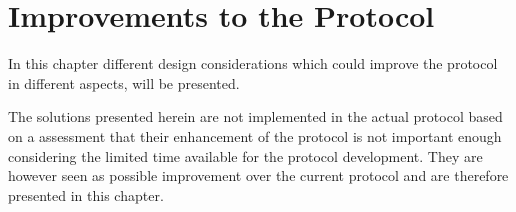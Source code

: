\chapter{Improvements to the Protocol}
In this chapter different design considerations which could improve the protocol in different aspects, will be presented.

The solutions presented herein are not implemented in the actual protocol based on a assessment that their enhancement of the protocol is not important enough considering the limited time available for the protocol development. 
They are however seen as possible improvement over the current protocol and are therefore presented in this chapter. 



%
